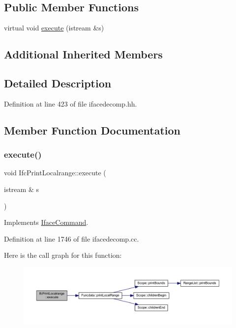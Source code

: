 \subsection*{Public Member Functions}
\begin{DoxyCompactItemize}
\item 
virtual void \mbox{\hyperlink{class_ifc_print_localrange_a30e3b78957d6afd8771280955d53ceb9}{execute}} (istream \&s)
\end{DoxyCompactItemize}
\subsection*{Additional Inherited Members}


\subsection{Detailed Description}


Definition at line 423 of file ifacedecomp.\+hh.



\subsection{Member Function Documentation}
\mbox{\label{class_ifc_print_localrange_a30e3b78957d6afd8771280955d53ceb9}} 
\subsubsection{\texorpdfstring{execute()}{execute()}}
{\footnotesize\ttfamily void Ifc\+Print\+Localrange\+::execute (\begin{DoxyParamCaption}\item[{istream \&}]{s }\end{DoxyParamCaption})\hspace{0.3cm}{\ttfamily [virtual]}}



Implements \mbox{\hyperlink{class_iface_command_af10e29cee2c8e419de6efe9e680ad201}{Iface\+Command}}.



Definition at line 1746 of file ifacedecomp.\+cc.

Here is the call graph for this function\+:
\nopagebreak
\begin{figure}[H]
\begin{center}
\leavevmode
\includegraphics[width=350pt]{class_ifc_print_localrange_a30e3b78957d6afd8771280955d53ceb9_cgraph}
\end{center}
\end{figure}


